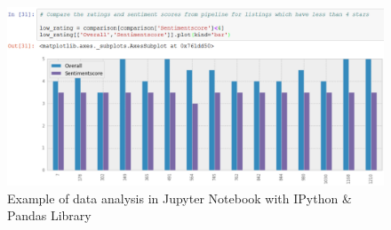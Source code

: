 \begin{figure}[h!]
\centering
	\includegraphics[height=0.25\textheight]{data_comparison}
	\caption{Example of data analysis in Jupyter Notebook with IPython \& Pandas Library}
	\label{fig:comp}
\end{figure}
